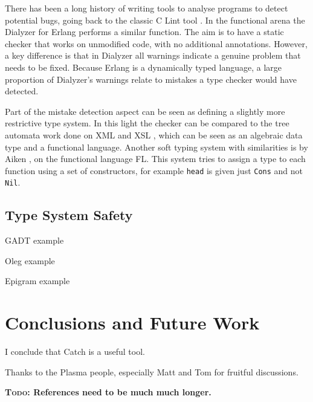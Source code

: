 \documentclass[preprint]{sigplanconf}
\newcommand{\T}[1]{\texttt{#1}}
\newcommand{\todo}[1]{\textbf{\textsc{Todo:} #1}}
\begin{document}
There has been a long history of writing tools to analyse programs to detect potential bugs, going back to the classic C Lint tool \citep{lint}. In the functional arena the Dialyzer \citep{dialyzer} for Erlang \citep{erlang} performs a similar function. The aim is to have a static checker that works on unmodified code, with no additional annotations. However, a key difference is that in Dialyzer all warnings indicate a genuine problem that needs to be fixed. Because Erlang is a dynamically typed language, a large proportion of Dialyzer's warnings relate to mistakes a type checker would have detected.

Part of the mistake detection aspect can be seen as defining a slightly more restrictive type system. In this light the checker can be compared to the tree automata work done on XML \citep{xml} and XSL \citep{static_xslt}, which can be seen as an algebraic data type and a functional language. Another soft typing system with similarities is by Aiken \cite{type:dynamic}, on the functional language FL. This system tries to assign a type to each function using a set of constructors, for example \T{head} is given just \T{Cons} and not \T{Nil}.

\subsection{Type System Safety}

GADT example

Oleg example

Epigram example


\section{Conclusions and Future Work}
\label{sec:conclusion}

I conclude that Catch is a useful tool.




%

\acks

Thanks to the Plasma people, especially Matt and Tom for fruitful discussions.

\todo{References need to be much much longer.}



\end{document}
